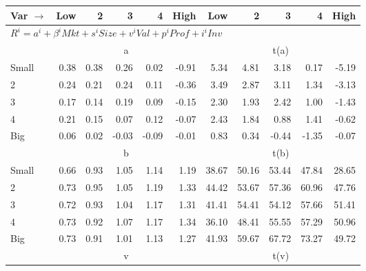 
\begin{tabular}{lrrrrrrrrrr}
  \toprule
    Var $\rightarrow$ & Low & 2 & 3 & 4 & High & Low & 2 & 3 & 4 & High \\ 
  \midrule
  \multicolumn{11}{l}{$R^i=a^i+\beta^iMkt+s^iSize+v^iVal+p^iProf+i^iInv$} \\

  
    
      & \multicolumn{5}{c}{a} & \multicolumn{5}{c}{t(a)}
    
    \\
      \cmidrule(r){2-6} \cmidrule(r){7-11}

    Small   & 0.38  & 0.38  & 0.26  & 0.02  & -0.91  & 5.34  & 4.81  & 3.18  & 0.17  & -5.19  \\
         2  & 0.24  & 0.21  & 0.24  & 0.11  & -0.36  & 3.49  & 2.87  & 3.11  & 1.34  & -3.13  \\
         3  & 0.17  & 0.14  & 0.19  & 0.09  & -0.15  & 2.30  & 1.93  & 2.42  & 1.00  & -1.43  \\
         4  & 0.21  & 0.15  & 0.07  & 0.12  & -0.07  & 2.43  & 1.84  & 0.88  & 1.41  & -0.62  \\
    Big     & 0.06  & 0.02  & -0.03  & -0.09  & -0.01  & 0.83  & 0.34  & -0.44  & -1.35  & -0.07  \\

  
    
      & \multicolumn{5}{c}{b} & \multicolumn{5}{c}{t(b)}
    
    \\
      \cmidrule(r){2-6} \cmidrule(r){7-11}

    Small   & 0.66  & 0.93  & 1.05  & 1.14  & 1.19  & 38.67  & 50.16  & 53.44  & 47.84  & 28.65  \\
         2  & 0.73  & 0.95  & 1.05  & 1.19  & 1.33  & 44.42  & 53.67  & 57.36  & 60.96  & 47.76  \\
         3  & 0.72  & 0.93  & 1.04  & 1.17  & 1.31  & 41.41  & 54.41  & 54.12  & 57.66  & 51.41  \\
         4  & 0.73  & 0.92  & 1.07  & 1.17  & 1.34  & 36.10  & 48.41  & 55.55  & 57.29  & 50.96  \\
    Big     & 0.73  & 0.91  & 1.01  & 1.13  & 1.27  & 41.93  & 59.67  & 67.72  & 73.27  & 49.72  \\

  
    
      & \multicolumn{5}{c}{v} & \multicolumn{5}{c}{t(v)}
    
    \\
      \cmidrule(r){2-6} \cmidrule(r){7-11}


\end{tabular}
